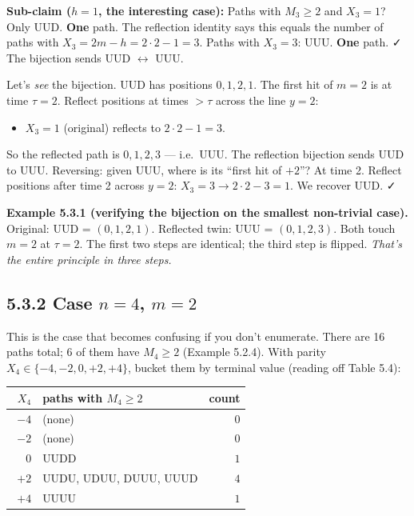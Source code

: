 \documentclass[
  10pt,
  twoside]{book}
\newcounter{none} %
\providecommand{\tightlist}{%
  \setlength{\itemsep}{0pt}\setlength{\parskip}{0pt}}
\begin{document}
\textbf{Sub-claim (\(h = 1\), the interesting case):} Paths with
\(M_3 \ge 2\) and \(X_3 = 1\)? Only UUD. \textbf{One} path. The
reflection identity says this equals the number of paths with
\(X_3 = 2m - h = 2 \cdot 2 - 1 = 3\). Paths with \(X_3 = 3\): UUU.
\textbf{One} path. ✓ The bijection sends UUD \(\leftrightarrow\) UUU.

Let's \emph{see} the bijection. UUD has positions \(0, 1, 2, 1\). The
first hit of \(m = 2\) is at time \(\tau = 2\). Reflect positions at
times \(> \tau\) across the line \(y = 2\):

\begin{itemize}
\tightlist
\item
  \(X_3 = 1\) (original) reflects to \(2 \cdot 2 - 1 = 3\).
\end{itemize}

So the reflected path is \(0, 1, 2, 3\) --- i.e.~UUU. The reflection
bijection sends UUD to UUU. Reversing: given UUU, where is its ``first
hit of \(+2\)''? At time 2. Reflect positions after time 2 across
\(y = 2\): \(X_3 = 3 \to 2 \cdot 2 - 3 = 1\). We recover UUD. ✓

\textbf{Example 5.3.1 (verifying the bijection on the smallest
non-trivial case).} Original: UUD = \((0, 1, 2, 1)\). Reflected twin:
UUU = \((0, 1, 2, 3)\). Both touch \(m = 2\) at \(\tau = 2\). The first
two steps are identical; the third step is flipped. \emph{That's the
entire principle in three steps.}

\subsection{\texorpdfstring{5.3.2 Case \(n = 4\),
\(m = 2\)}{5.3.2 Case n = 4, m = 2}}\label{case-n-4-m-2}

This is the case that becomes confusing if you don't enumerate. There
are 16 paths total; 6 of them have \(M_4 \ge 2\) (Example 5.2.4). With
parity \(X_4 \in \{-4,-2,0,+2,+4\}\), bucket them by terminal value
(reading off Table 5.4):

{\def\LTcaptype{none} %
\begin{table}[H]
\centering
\begin{tabular}{|r|l|r|}
\toprule
\(X_4\) & paths with \(M_4 \ge 2\) & count \\
\midrule



\(-4\) & (none) & \(0\) \\
\(-2\) & (none) & \(0\) \\
\(\phantom{+}0\) & UUDD & \(1\) \\
\(+2\) & UUDU, UDUU, DUUU, UUUD & \(4\) \\
\(+4\) & UUUU & \(1\) \\
\bottomrule
\end{tabular}
\end{table}
}
\end{document}
